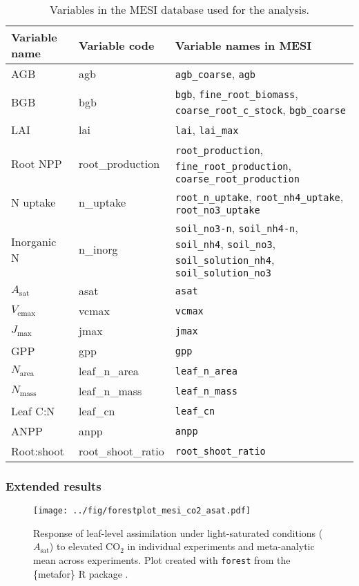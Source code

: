 \documentclass{myreport}
\begin{document}
\begin{table}
 \caption{Variables in the MESI database used for the analysis.}
\begin{tabular}{p{0.2\linewidth} p{0.2\linewidth} p{0.6\linewidth}}
  \toprule
  Variable name & Variable code & Variable names in MESI  \\
  \midrule
  AGB & agb & \texttt{agb\_coarse}, \texttt{agb} \\
  BGB & bgb & \texttt{bgb}, \texttt{fine\_root\_biomass}, \texttt{coarse\_root\_c\_stock}, \texttt{bgb\_coarse} \\
  LAI & lai & \texttt{lai}, \texttt{lai\_max} \\
  Root NPP & root\_production & \texttt{root\_production}, \texttt{fine\_root\_production}, \texttt{coarse\_root\_production} \\
  N uptake & n\_uptake & \texttt{root\_n\_uptake}, \texttt{root\_nh4\_uptake}, \texttt{root\_no3\_uptake} \\
  Inorganic N & n\_inorg & \texttt{soil\_no3-n}, \texttt{soil\_nh4-n}, \texttt{soil\_nh4}, \texttt{soil\_no3}, \texttt{soil\_solution\_nh4}, \texttt{soil\_solution\_no3} \\
  $A_\text{sat}$ & asat & \texttt{asat} \\
  $V_\text{cmax}$ & vcmax & \texttt{vcmax} \\
  $J_\text{max}$ & jmax & \texttt{jmax} \\
  GPP & gpp & \texttt{gpp} \\
  $N_\text{area}$ & leaf\_n\_area & \texttt{leaf\_n\_area} \\
  $N_\text{mass}$ & leaf\_n\_mass & \texttt{leaf\_n\_mass} \\
  Leaf C:N & leaf\_cn & \texttt{leaf\_cn} \\
  ANPP & anpp & \texttt{anpp} \\
  Root:shoot & root\_shoot\_ratio & \texttt{root\_shoot\_ratio} \\
  \bottomrule
\end{tabular}
\label{tab:varnams_mesi}
\end{table}

\subsubsection{Extended results}

\begin{figure}[h]
\centering
\texttt{[image: ../fig/forestplot\_mesi\_co2\_asat.pdf]}
\caption{Response of leaf-level assimilation under light-saturated conditions ($A_\text{sat}$) to elevated CO$_2$ in individual experiments and meta-analytic mean across experiments. Plot created with \texttt{forest} from the \{metafor\} R package \cite{viechtbauer_conducting_2010}.}
\end{figure}
\end{document}
